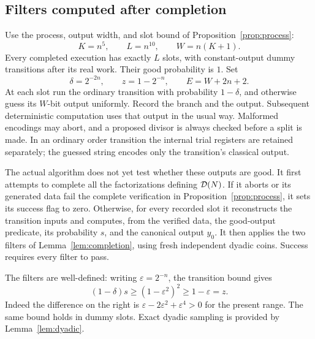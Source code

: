 \subsection{Filters computed after completion}

Use the process, output width, and slot bound of Proposition~\ref{prop:process}:
\[
 K=n^5,\qquad L=n^{10},\qquad W=n(K+1).
\]
Every completed execution has exactly $L$ slots, with constant-output dummy transitions after its real work. Their good probability is $1$. Set
\begin{equation}\label{eq:delta-z}
 \delta=2^{-2n},\qquad z=1-2^{-n},\qquad E=W+2n+2.
\end{equation}
At each slot run the ordinary transition with probability $1-\delta$, and otherwise guess its $W$-bit output uniformly. Record the branch and the output. Subsequent deterministic computation uses that output in the usual way. Malformed encodings may abort, and a proposed divisor is always checked before a split is made. In an ordinary order transition the internal trial registers are retained separately; the guessed string encodes only the transition's classical output.

The actual algorithm does not yet test whether these outputs are good. It first attempts to complete all the factorizations defining $\mathcal D(N)$. If it aborts or its generated data fail the complete verification in Proposition~\ref{prop:process}, it sets its success flag to zero. Otherwise, for every recorded slot it reconstructs the transition inputs and computes, from the verified data, the good-output predicate, its probability $s$, and the canonical output $y_0$. It then applies the two filters of Lemma~\ref{lem:completion}, using fresh independent dyadic coins. Success requires every filter to pass.

The filters are well-defined: writing $\varepsilon=2^{-n}$, the transition bound gives
\begin{equation}\label{eq:completion-bound}
 (1-\delta)s\ge(1-\varepsilon^2)^2\ge1-\varepsilon=z.
\end{equation}
Indeed the difference on the right is $\varepsilon-2\varepsilon^2+\varepsilon^4>0$ for the present range. The same bound holds in dummy slots. Exact dyadic sampling is provided by Lemma~\ref{lem:dyadic}.

